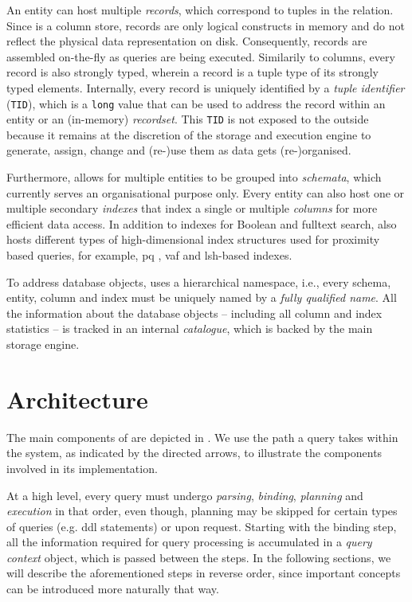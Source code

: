 An entity can host multiple \emph{records}, which correspond to tuples in the relation. Since \cottontail{} is a column store, records are only logical constructs in memory and do not reflect the physical data representation on disk. Consequently, records are assembled on-the-fly as queries are being executed. Similarily to columns, every record is also strongly typed, wherein a record is a tuple type of its strongly typed elements. Internally, every record is uniquely identified by a \emph{tuple identifier} (\texttt{TID}), which is a \texttt{long} value that can be used to address the record within an entity or an (in-memory) \emph{recordset}. This \texttt{TID} is not exposed to the outside because it remains at the discretion of the storage and execution engine to generate, assign, change and (re-)use them as data gets (re-)organised.

Furthermore, \cottontail{} allows for multiple entities to be grouped into \emph{schemata}, which currently serves an organisational purpose only. Every entity can also host one or multiple secondary \emph{indexes} that index a single or multiple \emph{columns} for more efficient data access. In addition to indexes for Boolean and fulltext search, \cottontail{} also hosts different types of high-dimensional index structures used for proximity based queries, for example, \acrshort{pq} \cite{Jegou:2010Product}, \acrshort{vaf} \cite{Weber:1998Va} and \acrshort{lsh}-based \cite{Indyk1998:Approximate} indexes.

To address database objects, \cottontail{} uses a hierarchical namespace, i.e., every schema, entity, column and index must be uniquely named by a \emph{fully qualified name}. All the information about the database objects -- including all column and index statistics  -- is tracked in an internal \emph{catalogue}, which is backed by the main storage engine.


\section{Architecture} 

The main components of \cottontail{} are depicted in . We use the path a query takes within the system, as indicated by the directed arrows, to illustrate the components involved in its implementation.

At a high level, every query must undergo \emph{parsing}, \emph{binding}, \emph{planning} and \emph{execution} in that order, even though, planning may be skipped for certain types of queries (e.g. \acrshort{ddl} statements) or upon request. Starting with the binding step, all the information required for query processing is accumulated in a \emph{query context} object, which is passed between the steps. In the following sections, we will describe the aforementioned steps in reverse order, since important concepts can be introduced more naturally that way.

